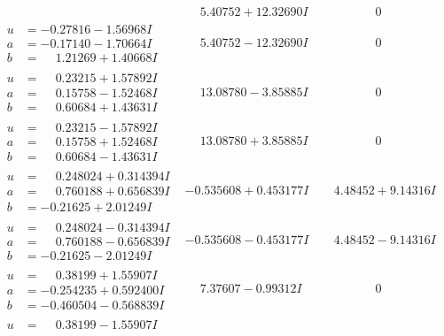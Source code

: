 \documentclass[1p]{elsarticle_modified}
\theoremstyle{definition}
\begin{document}
$$\begin{array}{c|c|c}
 & \phantom{-}5.40752 + 12.32690 I & \phantom{-0.000000 } 0 \\ \hline\begin{aligned}
u &= -0.27816 - 1.56968 I \\
a &= -0.17140 - 1.70664 I \\
b &= \phantom{-}1.21269 + 1.40668 I\end{aligned}
 & \phantom{-}5.40752 - 12.32690 I & \phantom{-0.000000 } 0 \\ \hline\begin{aligned}
u &= \phantom{-}0.23215 + 1.57892 I \\
a &= \phantom{-}0.15758 - 1.52468 I \\
b &= \phantom{-}0.60684 + 1.43631 I\end{aligned}
 & \phantom{-}13.08780 - 3.85885 I & \phantom{-0.000000 } 0 \\ \hline\begin{aligned}
u &= \phantom{-}0.23215 - 1.57892 I \\
a &= \phantom{-}0.15758 + 1.52468 I \\
b &= \phantom{-}0.60684 - 1.43631 I\end{aligned}
 & \phantom{-}13.08780 + 3.85885 I & \phantom{-0.000000 } 0 \\ \hline\begin{aligned}
u &= \phantom{-}0.248024 + 0.314394 I \\
a &= \phantom{-}0.760188 + 0.656839 I \\
b &= -0.21625 + 2.01249 I\end{aligned}
 & -0.535608 + 0.453177 I & \phantom{-}4.48452 + 9.14316 I \\ \hline\begin{aligned}
u &= \phantom{-}0.248024 - 0.314394 I \\
a &= \phantom{-}0.760188 - 0.656839 I \\
b &= -0.21625 - 2.01249 I\end{aligned}
 & -0.535608 - 0.453177 I & \phantom{-}4.48452 - 9.14316 I \\ \hline\begin{aligned}
u &= \phantom{-}0.38199 + 1.55907 I \\
a &= -0.254235 + 0.592400 I \\
b &= -0.460504 - 0.568839 I\end{aligned}
 & \phantom{-}7.37607 - 0.99312 I & \phantom{-0.000000 } 0 \\ \hline\begin{aligned}
u &= \phantom{-}0.38199 - 1.55907 I \\

\end{aligned}
\end{array}$$
\end{document}
